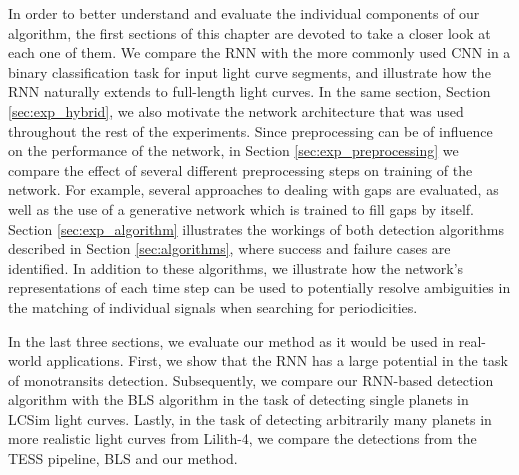 
In order to better understand and evaluate the individual components of our algorithm, the first sections of this chapter are devoted to take a closer look at each one of them. We compare the RNN with the more commonly used CNN in a binary classification task for input light curve segments, and illustrate how the RNN naturally extends to full-length light curves. In the same section, Section \ref{sec:exp_hybrid}, we also motivate the network architecture that was used throughout the rest of the experiments. Since preprocessing can be of influence on the performance of the network, in Section \ref{sec:exp_preprocessing} we compare the effect of several different preprocessing steps on training of the network. For example, several approaches to dealing with gaps are evaluated, as well as the use of a generative network which is trained to fill gaps by itself.
Section \ref{sec:exp_algorithm} illustrates the workings of both detection algorithms described in Section \ref{sec:algorithms}, where success and failure cases are identified. In addition to these algorithms, we illustrate how the network's representations of each time step can be used to potentially resolve ambiguities in the matching of individual signals when searching for periodicities. 

In the last three sections, we evaluate our method as it would be used in real-world applications. First, we show that the RNN has a large potential in the task of monotransits detection. Subsequently, we compare our RNN-based detection algorithm with the BLS algorithm in the task of detecting single planets in LCSim light curves. Lastly, in the task of detecting arbitrarily many planets in more realistic light curves from Lilith-4, we compare the detections from the TESS pipeline, BLS and our method. 